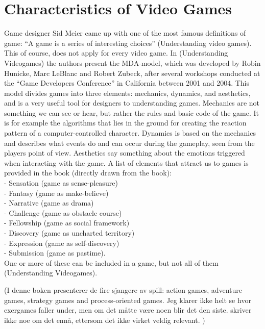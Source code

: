 \chapter{Characteristics of Video Games}
Game designer Sid Meier came up with one of the most famous definitions of game: “A game is a series of interesting choices” (Understanding video games). This of course, does not apply for every video game. In (Understanding Videogames) the authors present the MDA-model, which was developed by Robin Hunicke, Marc LeBlanc and Robert Zubeck, after several workshops conducted at the “Game Developers Conference” in California between 2001 and 2004. This model divides games into three elements: mechanics, dynamics, and aesthetics, and is a very useful tool for designers to understanding games. Mechanics are not something we can see or hear, but rather the rules and basic code of the game. It is for example the algorithms that lies in the ground for creating the reaction pattern of a computer-controlled character. Dynamics is based on the mechanics and describes what events do and can occur during the gameplay, seen from the players point of view. Aesthetics say something about the emotions triggered when interacting with the game. A list of elements  that attract us to games is provided in the book (directly drawn from the book): \\
- Sensation (game as sense-pleasure)\\
- Fantasy (game as make-believe)\\
- Narrative (game as drama)\\
- Challenge (game as obstacle course)\\
- Fellowship (game as social framework)\\
- Discovery (game as uncharted territory)\\
- Expression (game as self-discovery)\\
- Submission (game as pastime).\\
One or more of these can be included in a game, but not all of them (Understanding Videogames).

(I denne boken presenterer de fire sjangere av spill: action games, adventure games, strategy games and process-oriented games. Jeg klarer ikke helt se hvor exergames faller under, men om det måtte være noen blir det den siste. skriver ikke noe om det ennå, ettersom det ikke virket veldig relevant. )

